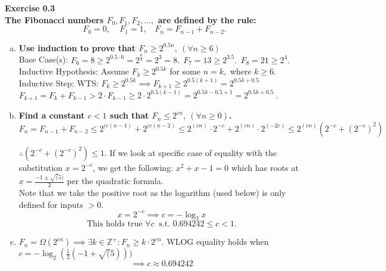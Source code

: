 \documentclass{article}
\newenvironment{problem}[2][Exercise]
    { \begin{mdframed}[backgroundcolor=gray!20] \textbf{#1 #2} \\}
    {  \end{mdframed}}
\renewcommand{\qed}{\quad\qedsymbol}
\begin{document}
\begin{problem}{0.3}
    \textbf{The Fibonacci numbers $F_0, F_1, F_2, \ldots,$ are defined by the rule:}
    \[
        F_0=0, \ \ \ \ \ 
        F_1=1, \ \ \ \ 
        F_n=F_{n-1}+F_{n-2}.
    \]

    \begin{enumerate}[(a)]
        \item \textbf{Use induction to prove that $F_n \geq 2^{0.5n}, \ (\forall n \geq 6)$}
        \\
        Base Case(s):
        $F_6 = 8 \geq 2^{0.5 \cdot 6} = 2^{\frac{6}{2}} = 2^3 = 8. \ \ F_7=13 \geq 2^{3.5}. \ \ F_8=21 \geq 2^4.$
        \\
        Inductive Hypothesis:
        Assume $F_k\geq2^{0.5k}$ for some $n=k,$ where $k\geq6$.
        \\
        Inductive Step:
        WTS: $F_k\geq2^{0.5k}
        \implies
        F_{k+1}\geq2^{0.5(k+1)}
        =2^{0.5k+0.5}$
        \\
        $F_{k+1}=F_{k}+F_{k-1}
        > 2\cdot F_{k-1}
        \geq 2\cdot 2^{0.5(k-1)}
        = 2^{0.5k-0.5+1} 
        = \boxed{2^{0.5k+0.5}} \ .$
        \qed
        
        \item \textbf{Find a constant $c < 1$ such that $F_n \leq 2^{cn}, \  (\forall n \geq 0)$.}
        \\
        $F_n = F_{n-1} + F_{n-2} 
        \leq 2^{(c(n-1)} + 2^{(c(n-2)} 
        \leq 2^{(cn)} \cdot 2^{-c} + 2^{(cn)} \cdot 2^{(-2c)} 
        \leq 2^{(cn)} (2^{-c} + (2^{-c})^2)$
        
        $\therefore (2^{-c} + (2^{-c})^2) \leq 1$. If we look at specific case of equality with the substitution $x=2^{-c}$, we get the following: $x^2 + x - 1 = 0$
        which has roots at $x = \frac{-1 \pm \sqrt(5)}{2}$ per the quadratic formula.
        \\
        Note that we take the positive root as the logarithm (used below) is only defined for inputs $>0$.
        \[
            x=2^{-c}
            \implies
            c = -\log_2 x
        \]
        \[
            \boxed{\text{This holds true }\forall c \ \text{ s.t. } 0.694242 \leq c < 1}.
        \]
        
        \item $F_n=\Omega(2^{cn})\implies\exists k\in\mathbb Z^+: F_n \geq k\cdot 2^{cn}$.
        WLOG equality holds when $c=-\log_2(\frac12 (-1 + \sqrt(5)))$
        \[
            \implies
            \boxed{c \approx 0.694242}
        \]
    \end{enumerate}
\end{problem}
\end{document}
